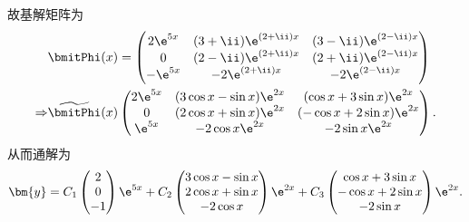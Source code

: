\begin{solve}
  故基解矩阵为
  \[\begin{split}
  &\bmitPhi(x)=\begin{pmatrix}2\e^{5x}&(3+\ii)\e^{(2+\ii)x}&(3-\ii)\e^{(2-\ii)x}\\0&(2-\ii)\e^{(2+\ii)x}&(2+\ii)\e^{(2-\ii)x}\\-\e^{5x}&-2\e^{(2+\ii)x}&-2\e^{(2-\ii)x}\end{pmatrix}\\
  \Rightarrow&\widetilde{\bmitPhi}(x)\begin{pmatrix}2\e^{5x}&(3\cos x-\sin x)\e^{2x}&(\cos x+3\sin x)\e^{2x}\\0&(2\cos x+\sin x)\e^{2x}&(-\cos x+2\sin x)\e^{2x}\\\e^{5x}&-2\cos x\e^{2x}&-2\sin x\e^{2x}\end{pmatrix}.
  \end{split}\]
  从而通解为
  \[\bm{y} = C_1\begin{pmatrix}2\\0\\-1\end{pmatrix}\e^{5x}
    + C_2\begin{pmatrix}3\cos x-\sin x\\2\cos x+\sin x\\-2\cos x\end{pmatrix}\e^{2x}
    + C_3\begin{pmatrix}\cos x+3\sin x\\-\cos x+2\sin x\\-2\sin x\end{pmatrix}\e^{2x}.\]


\end{solve}

